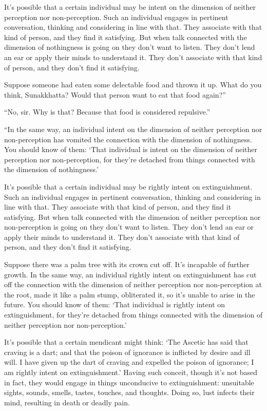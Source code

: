 \documentclass[12pt,openany]{book}%
\begin{document}
It’s possible that a certain individual may be intent on the dimension of neither perception nor non-perception. Such an individual engages in pertinent conversation, thinking and considering in line with that. They associate with that kind of person, and they find it satisfying. But when talk connected with the dimension of nothingness is going on they don’t want to listen. They don’t lend an ear or apply their minds to understand it. They don’t associate with that kind of person, and they don’t find it satisfying. 

Suppose someone had eaten some delectable food and thrown it up. What do you think, Sunakkhatta? Would that person want to eat that food again?” 

“No, sir. Why is that? Because that food is considered repulsive.” 

“In the same way, an individual intent on the dimension of neither perception nor non-perception has vomited the connection with the dimension of nothingness. You should know of them: ‘That individual is intent on the dimension of neither perception nor non-perception, for they’re detached from things connected with the dimension of nothingness.’ 

It’s possible that a certain individual may be rightly intent on extinguishment. Such an individual engages in pertinent conversation, thinking and considering in line with that. They associate with that kind of person, and they find it satisfying. But when talk connected with the dimension of neither perception nor non-perception is going on they don’t want to listen. They don’t lend an ear or apply their minds to understand it. They don’t associate with that kind of person, and they don’t find it satisfying. 

Suppose there was a palm tree with its crown cut off. It’s incapable of further growth. In the same way, an individual rightly intent on extinguishment has cut off the connection with the dimension of neither perception nor non-perception at the root, made it like a palm stump, obliterated it, so it’s unable to arise in the future. You should know of them: ‘That individual is rightly intent on extinguishment, for they’re detached from things connected with the dimension of neither perception nor non-perception.’ 

It’s possible that a certain mendicant might think: ‘The Ascetic has said that craving is a dart; and that the poison of ignorance is inflicted by desire and ill will. I have given up the dart of craving and expelled the poison of ignorance; I am rightly intent on extinguishment.’ Having such conceit, though it’s not based in fact, they would engage in things unconducive to extinguishment: unsuitable sights, sounds, smells, tastes, touches, and thoughts. Doing so, lust infects their mind, resulting in death or deadly pain. 
\end{document}
